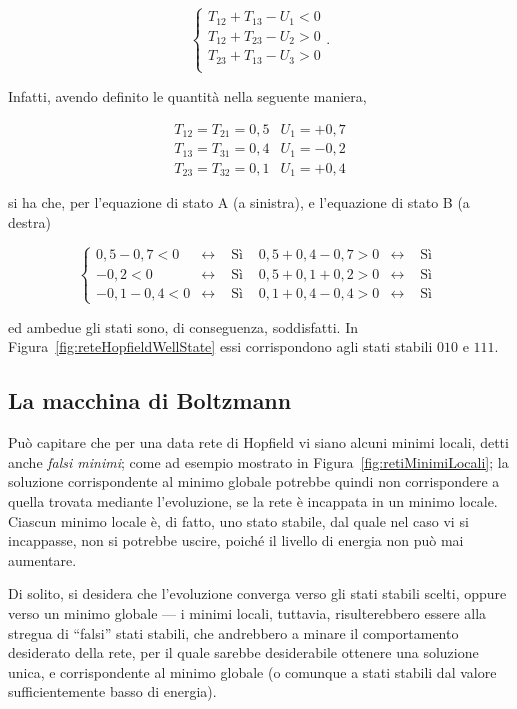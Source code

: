 \documentclass[10pt]{book}
\begin{document}
$$
\left\{
    \begin{array}{l}
        T_{12} + T_{13} - U_1 < 0 \\
        T_{12} + T_{23} - U_2 > 0 \\
        T_{23} + T_{13} - U_3 > 0 \\
    \end{array}
\right. .
$$

Infatti, avendo definito le quantità nella seguente maniera,

$$
\begin{array}{ll}
    T_{12} = T_{21} = 0,5 & U_1 = +0,7\\
    T_{13} = T_{31} = 0,4 & U_1 = -0,2\\
    T_{23} = T_{32} = 0,1 & U_1 = +0,4
\end{array}
$$

si ha che, per l'equazione di stato A (a sinistra), e l'equazione di stato B (a
destra)

$$
\left\{
    \begin{array}{llllll}
        0,5 - 0,7 < 0 & \leftrightarrow & \mbox{ Sì } & 0,5 + 0,4 - 0,7 > 0 & \leftrightarrow & \mbox{ Sì } \\
        -0,2  < 0 & \leftrightarrow & \mbox{ Sì } & 0,5 + 0,1 + 0,2 > 0 & \leftrightarrow & \mbox{ Sì } \\
        -0,1 - 0,4 < 0 & \leftrightarrow & \mbox{ Sì } & 0,1 + 0,4 - 0,4 > 0 & \leftrightarrow & \mbox{ Sì }
    \end{array}
\right.
$$

ed ambedue gli stati sono, di conseguenza, soddisfatti. In
Figura~\ref{fig:reteHopfieldWellState} essi corrispondono agli stati stabili
$010$ e $111$.

\subsection{La macchina di Boltzmann}

Può capitare che per una data rete di Hopfield vi siano alcuni minimi locali,
detti anche \emph{falsi minimi}; come ad esempio mostrato in
Figura~\ref{fig:retiMinimiLocali}; la soluzione corrispondente al minimo
globale potrebbe quindi non corrispondere a quella trovata mediante
l'evoluzione, se la rete è incappata in un minimo locale. Ciascun minimo locale
è, di fatto, uno stato stabile, dal quale nel caso vi si incappasse, non si
potrebbe uscire, poiché il livello di energia non può mai aumentare. 

Di solito,
si desidera che l'evoluzione converga verso gli stati stabili scelti, oppure
verso un minimo globale \---- i minimi locali, tuttavia, risulterebbero essere
alla stregua di ``falsi'' stati stabili, che andrebbero a minare il
comportamento desiderato della rete, per il quale sarebbe desiderabile ottenere
una soluzione unica, e corrispondente al minimo globale (o comunque a stati
stabili dal valore sufficientemente basso di energia). 
\end{document}
